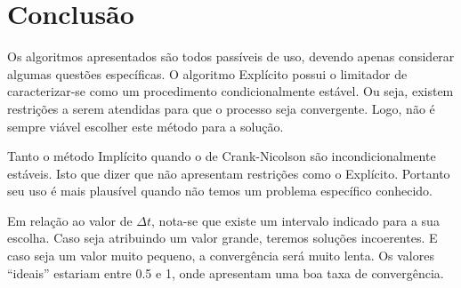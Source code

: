 \documentclass[
	11pt,				%
	oneside,			%
	a4paper,			%
	english,			%
	brazil,				%
	]{article}
\begin{document}
\section{Conclusão}
Os algoritmos apresentados são todos passíveis de uso, devendo apenas 
considerar algumas questões específicas. O algoritmo Explícito possui o 
limitador de caracterizar-se como um procedimento condicionalmente estável. Ou 
seja, existem restrições a serem atendidas para que o processo seja 
convergente. Logo, não é sempre viável escolher este método para a solução.

Tanto o método Implícito quando o de Crank-Nicolson são incondicionalmente 
estáveis. Isto que dizer que não apresentam restrições como o Explícito. 
Portanto seu uso é mais plausível quando não temos um problema específico 
conhecido.

Em relação ao valor de $\Delta t$, nota-se que existe um intervalo indicado 
para a sua escolha. Caso seja atribuindo um valor grande, teremos soluções 
incoerentes. E caso seja um valor muito pequeno, a convergência será muito 
lenta. Os valores ``ideais'' estariam entre 0.5 e 1, onde apresentam uma boa 
taxa de convergência.
\end{document}
